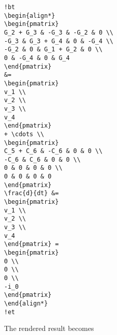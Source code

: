 \documentclass[]{article}
\begin{document}
\begin{verbatim}
!bt
\begin{align*}
\begin{pmatrix}
G_2 + G_3 & -G_3 & -G_2 & 0 \\ 
-G_3 & G_3 + G_4 & 0 & -G_4 \\ 
-G_2 & 0 & G_1 + G_2 & 0 \\ 
0 & -G_4 & 0 & G_4
\end{pmatrix}
&=
\begin{pmatrix}
v_1 \\ 
v_2 \\ 
v_3 \\ 
v_4
\end{pmatrix}
+ \cdots \\ 
\begin{pmatrix}
C_5 + C_6 & -C_6 & 0 & 0 \\ 
-C_6 & C_6 & 0 & 0 \\ 
0 & 0 & 0 & 0 \\ 
0 & 0 & 0 & 0
\end{pmatrix}
\frac{d}{dt} &=
\begin{pmatrix}
v_1 \\ 
v_2 \\ 
v_3 \\ 
v_4
\end{pmatrix} =
\begin{pmatrix}
0 \\ 
0 \\ 
0 \\ 
-i_0
\end{pmatrix}
\end{align*}
!et
\end{verbatim}

The rendered result becomes
\end{document}

